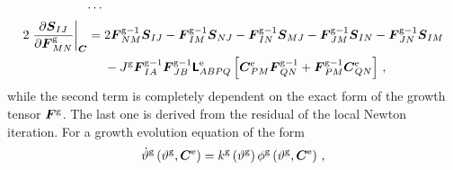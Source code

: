 \documentclass[10pt,letterpaper,oneside]{report}
\newcommand{\ten}[1]{\mbox{\boldmath $#1$}{}}
\newcommand{\tenf}[1]{\mbox{{\sffamily{\bfseries {#1}}}}}
\newcommand{\scas}[1]{\mbox{{\scriptsize{${\rm{#1}}$}}}{}}
\newcommand{\tens}[1]{\mbox{\boldmath{\scriptsize{$#1$}}}{}}
\begin{document}
\begin{itemize}
\begin{align}
\cdots{}& \notag \\
2 \left. \frac{\partial \ten{S}_{IJ}}{\partial \ten{F}^{\scas{g}}_{MN}} \right|_{\tens{C}} 
={}& 2 \ten{F}^{\scas{g}-1}_{NM} \ten{S}_{IJ} 
- \ten{F}^{\scas{g}-1}_{IM} \ten{S}_{NJ} - \ten{F}^{\scas{g}-1}_{IN} \ten{S}_{MJ} - \ten{F}^{\scas{g}-1}_{JM} \ten{S}_{IN} - \ten{F}^{\scas{g}-1}_{JN} \ten{S}_{IM} \notag \\
& - J^{\scas{g}} \ten{F}^{\scas{g}-1}_{IA} \ten{F}^{\scas{g}-1}_{JB} \tenf{L}^{\scas{e}}_{ABPQ} \left[ \ten{C}^{\scas{e}}_{PM} \ten{F}^{\scas{g}-1}_{QN} + \ten{F}^{\scas{g}-1}_{PM} \ten{C}^{\scas{e}}_{QN} \right] \, ,
\label{dSdFg}
\end{align}
while the second term is completely dependent on the exact form of the growth tensor $\ten{F}^{\scas{g}}$.  The last one is derived from the residual of the local Newton iteration.  For a growth evolution equation of the form 
\begin{equation}
\dot{\vartheta}^{\scas{g}} \left( \vartheta^{\scas{g}}, \ten{C}^{\scas{e}} \right) = k^{\scas{g}} \left( \vartheta^{\scas{g}} \right) \phi^{\scas{g}} \left( \vartheta^{\scas{g}}, \ten{C}^{\scas{e}} \right) \, , 

\end{equation}
\end{itemize}
\end{document}
